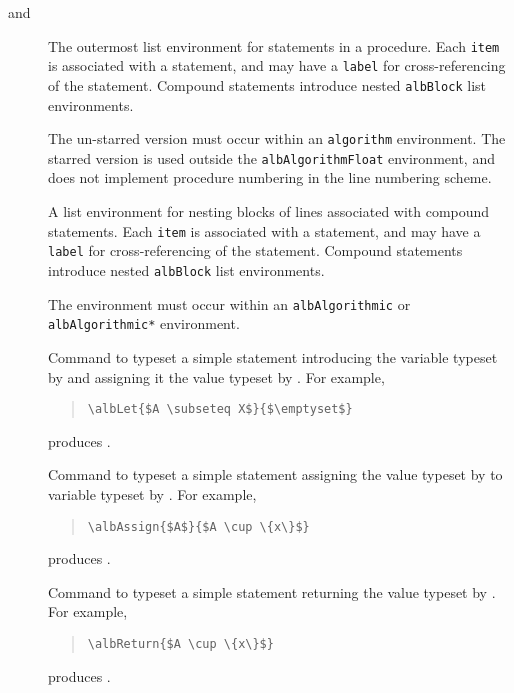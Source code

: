 \documentclass[11pt,a4paper,oneside,titlepage]{alb-latex}
\begin{document}
\begin{description}
\item[ and ] The
  outermost list environment for statements in a procedure.  Each
  \texttt{item} is associated with a statement, and may have a
  \texttt{label} for cross-referencing of the statement.  Compound
  statements introduce nested \texttt{albBlock} list environments.

  The un-starred version must occur within an \texttt{algorithm}
  environment.  The starred version is used outside the
  \texttt{albAlgorithmFloat} environment, and does not implement
  procedure numbering in the line numbering scheme.

\item[] A list environment for nesting blocks of
  lines associated with compound statements.  Each \texttt{item} is
  associated with a statement, and may have a \texttt{label} for
  cross-referencing of the statement.  Compound statements introduce
  nested \texttt{albBlock} list environments.

  The environment must occur within an \texttt{albAlgorithmic} or
  \texttt{albAlgorithmic*} environment.

\item[] Command to
  typeset a simple statement introducing the variable typeset by
   and assigning it the value typeset by .
  For example,
  \begin{quote}
\begin{verbatim}
\albLet{$A \subseteq X$}{$\emptyset$}
\end{verbatim}
  \end{quote}
  produces .

\item[] Command to
  typeset a simple statement assigning the value typeset by
   to variable typeset by .  For example,
  \begin{quote}
\begin{verbatim}
\albAssign{$A$}{$A \cup \{x\}$}
\end{verbatim}
  \end{quote}
  produces .

\item[] Command to typeset a simple
  statement returning the value typeset by .  For
  example,
  \begin{quote}
\begin{verbatim}
\albReturn{$A \cup \{x\}$}
\end{verbatim}
  \end{quote}
  produces .


\end{description}
\end{document}
